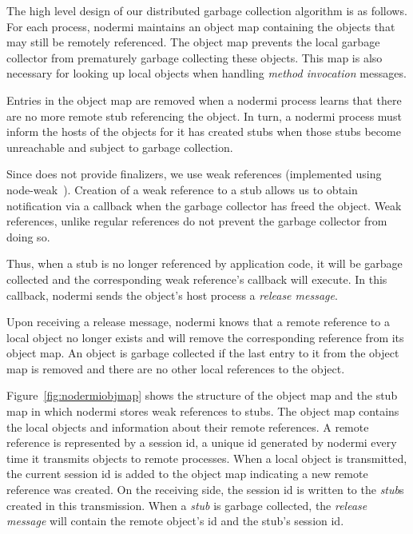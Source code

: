 
The high level design of our distributed garbage collection
algorithm is as follows.
For each process, nodermi maintains an object map containing the objects
that may still be remotely referenced.
The object map prevents the local garbage collector from prematurely garbage collecting
these objects.
This map is also necessary for looking up local objects
when handling \emph{method invocation} messages.

Entries in the object map are removed when a nodermi process learns that there
are no more remote stub referencing the object.   In turn, a nodermi
process must inform the hosts of the objects for it has created stubs
when those stubs become unreachable and subject to garbage collection.

Since \js does not provide finalizers, we use weak
references (implemented using node-weak~\cite{nodeweak}).
Creation of a weak reference to a stub allows us to obtain notification
via a callback when the garbage collector has freed the object.  Weak
references, unlike regular references do not prevent the garbage collector
from doing so.

Thus, when a stub is no longer referenced by application code, it will
be garbage collected and the corresponding weak reference's callback
will execute.  In this callback, nodermi
sends the object's host process a \emph{release message}.

Upon receiving a release message, nodermi knows that a remote
reference to a local object no longer exists and will remove the
corresponding reference from its object map.
An object is garbage collected if the last entry to it from the
object map is removed and there are no other local references to the
object.

%
%

\nodermiobjmapfig{}

Figure~\ref{fig:nodermiobjmap} shows the structure of the object
map and the stub map in which nodermi stores weak references to stubs.
The object map contains the local objects and information about their
remote references.  A remote reference is represented by a session id, a
unique id generated by nodermi every time it transmits objects to remote
processes.  When a local object is transmitted, the current session id
is added to the object map indicating a new remote reference was created.
On the receiving side, the session id is written to the \emph{stub}s
created in this transmission.  When a \emph{stub} is garbage collected,
the \emph{release message} will contain the remote object's id and
the stub's session id.

